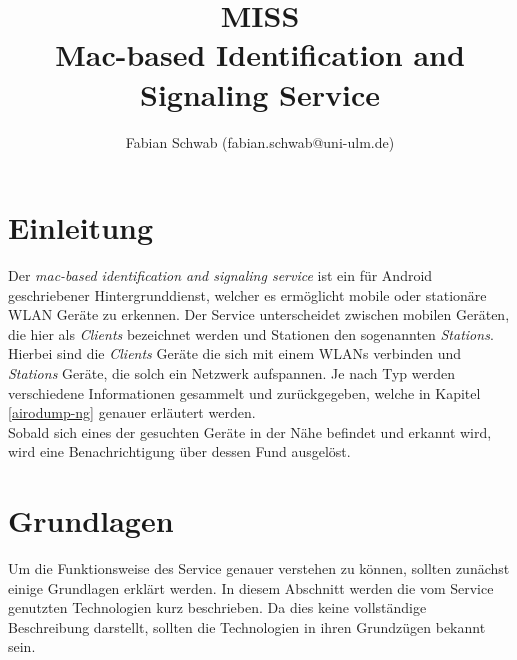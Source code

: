 \documentclass[]{report}
\title{MISS \\ Mac-based Identification and Signaling Service}
\author{Fabian Schwab (fabian.schwab@uni-ulm.de)}
\begin{document}
\maketitle

\chapter{Einleitung}
Der \textit{mac-based identification and signaling service} ist ein für Android geschriebener Hintergrunddienst, welcher es ermöglicht mobile oder stationäre WLAN Geräte zu erkennen. Der Service unterscheidet zwischen mobilen Geräten, die hier als \textit{Clients} bezeichnet werden und Stationen den sogenannten \textit{Stations}. Hierbei sind die \textit{Clients} Geräte die sich mit einem WLANs verbinden und \textit{Stations} Geräte, die solch ein Netzwerk aufspannen. Je nach Typ werden verschiedene Informationen gesammelt und zurückgegeben, welche in Kapitel \ref{airodump-ng} genauer erläutert werden.\\
Sobald sich eines der gesuchten Geräte in der Nähe befindet und erkannt wird, wird eine Benachrichtigung über dessen Fund ausgelöst.
\chapter{Grundlagen}
Um die Funktionsweise des Service genauer verstehen zu können, sollten zunächst einige Grundlagen erklärt werden. In diesem Abschnitt werden die vom Service genutzten Technologien kurz beschrieben. Da dies keine vollständige Beschreibung darstellt, sollten die Technologien in ihren Grundzügen bekannt sein. 
\end{document}
